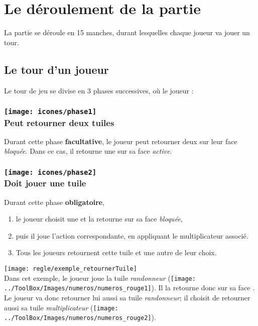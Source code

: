 \section*{Le déroulement de la partie} \label{sec:tourDeJeu}
La partie se déroule en 15 manches, durant lesquelles chaque joueur va jouer un tour.

\subsection*{Le tour d'un joueur} \label{sec:tourDeJoueur}
Le tour de jeu se divise en 3 phases successives, où le joueur :
\subsubsection*{\texttt{[image: icones/phase1]} \\ Peut retourner deux tuiles}
Durant cette phase \textbf{facultative}, le joueur peut retourner deux \tuilesActives sur leur face \textit{bloquée}. Dans ce cas, il retourne une \tuileBloquee sur sa face \textit{active}.

\subsubsection*{\texttt{[image: icones/phase2]} \\ Doit jouer une tuile}
Durant cette phase \textbf{obligatoire},
\begin{enumerate}
\item le joueur choisit une \tuileActive et la retourne sur sa face \textit{bloquée},
\item puis il joue l'action correspondante, en appliquant le multiplicateur associé.
\item Tous les joueurs retournent cette tuile et une autre de leur choix.
\end{enumerate}

{    
\texttt{[image: regle/exemple\_retournerTuile]}
\\

Dans cet exemple, le joueur \terre joue la tuile \textit{randonneur} (\texttt{[image: ../ToolBox/Images/numeros/numeros\_rouge1]}). Il la retourne donc sur sa face \tuileBloquee. Le joueur \nature va donc retourner lui aussi sa tuile \textit{randonneur}; il choisit de retourner aussi sa tuile \textit{multiplicateur}  (\texttt{[image: ../ToolBox/Images/numeros/numeros\_rouge2]}).

}
\FloatBarrier
    

